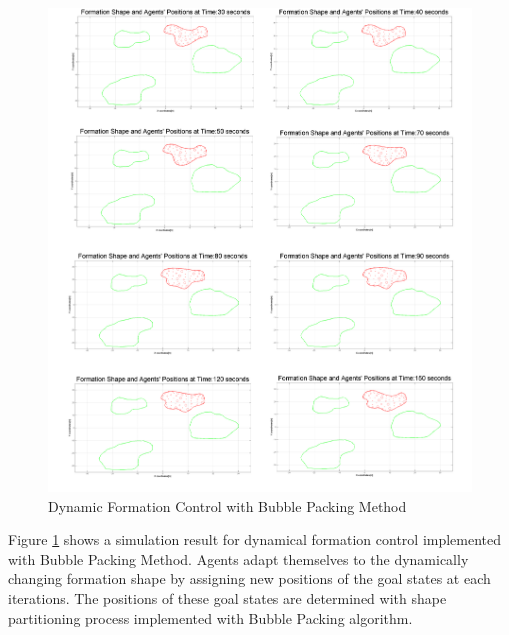 \begin{figure}[H]
\caption{Dynamic Formation Control with Bubble Packing Method} \label{multiple1_ref}
\centerline{\includegraphics[scale = 0.16]{multiple1}}
\end{figure} 

Figure \ref{multiple1_ref} shows a simulation result for dynamical formation control implemented with Bubble Packing Method. Agents adapt themselves to the dynamically changing formation shape by assigning new positions of the goal states at each iterations. The positions of these goal states are determined with shape partitioning process implemented with Bubble Packing algorithm. 

